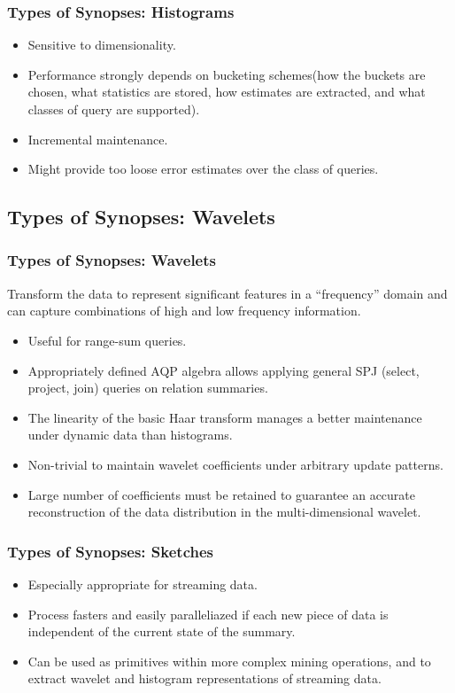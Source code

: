 \documentclass{beamer}
\begin{document}
\begin{frame}
\frametitle{Types of Synopses: Histograms}
\begin{itemize}
\item{Sensitive to dimensionality.}
\item{Performance strongly depends on bucketing schemes(how the buckets are chosen, what statistics are stored, how estimates are extracted, and what classes of query are supported).}
\item{Incremental maintenance.}
\item{Might provide too loose error estimates over the class of queries.}
\end{itemize}
\end{frame}

\subsection{Types of Synopses: Wavelets}
\begin{frame}
\frametitle{Types of Synopses: Wavelets}
Transform the data to represent significant features in a “frequency” domain and can capture combinations of high and low frequency information.\pause
\begin{itemize}
\item{Useful for range-sum queries.}
\item{Appropriately defined AQP algebra allows applying general SPJ (select, project, join) queries on relation summaries.}
\item{The linearity of the basic Haar transform manages a better maintenance under dynamic data than histograms.}
\item{Non-trivial to maintain wavelet coefficients under arbitrary update patterns.}
\item{Large number of coefficients must be retained to guarantee an accurate reconstruction of the data distribution in the multi-dimensional wavelet.}
\end{itemize}
\end{frame}

\begin{frame}
\frametitle{Types of Synopses: Sketches}
\begin{itemize}
\item{Especially appropriate for streaming data.}
\item{Process fasters and easily paralleliazed if each new piece of data is independent of the current state of the summary.}
\item{Can be used as primitives within more complex mining operations, and to extract wavelet and histogram representations of streaming data.}
\end{itemize}
\end{frame}
\end{document}
